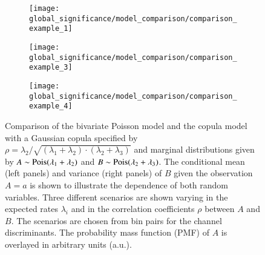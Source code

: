\begin{figure}[htbp]
  \centering

  \begin{subfigure}{\textwidth}
    \centering
    \texttt{[image: global\_significance/model\_comparison/comparison\_example\_1]}
  \end{subfigure}

  \begin{subfigure}{\textwidth}
    \centering
    \texttt{[image: global\_significance/model\_comparison/comparison\_example\_3]}
  \end{subfigure}

  \begin{subfigure}{\textwidth}
    \centering
    \texttt{[image: global\_significance/model\_comparison/comparison\_example\_4]}
  \end{subfigure}

  \caption{Comparison of the bivariate Poisson model and the copula
    model with a Gaussian copula specified by
    $\rho = \lambda_2 / \sqrt{(\lambda_1 + \lambda_2) \cdot (\lambda_2
      + \lambda_3)}$ and marginal distributions given by
    $A \sim \operatorname{Pois}(\lambda_1 + \lambda_2)$ and
    $B \sim \operatorname{Pois}(\lambda_2 + \lambda_3)$. The conditional mean (left
    panels) and variance (right panels) of $B$ given the observation
    $A = a$ is shown to illustrate the dependence of both random
    variables. Three different scenarios are shown varying in the
    expected rates $\lambda_i$ and in the correlation coefficients
    $\rho$ between $A$ and $B$. The scenarios are chosen from bin
    pairs for the \hadhad channel discriminants.  The probability mass
    function (PMF) of $A$ is overlayed in arbitrary units (a.u.).}%
  \label{fig:copula_model_comparison}
\end{figure}

